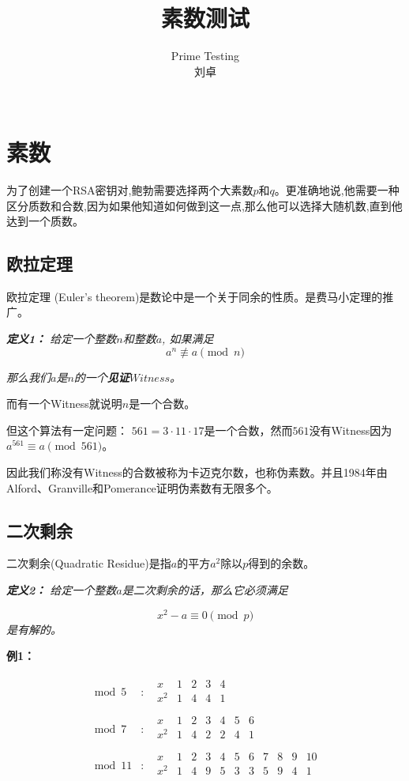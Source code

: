 \documentclass{article}
\date{}
\title{素数测试}
\author{
Prime Testing\\
 刘卓\\
 \texttt{ } \\
}
\begin{document}
\maketitle

\section{素数}


为了创建一个RSA密钥对,鲍勃需要选择两个大素数$p$和$q$。更准确地说,他需要一种区分质数和合数,因为如果他知道如何做到这一点,那么他可以选择大随机数,直到他达到一个质数。


\subsection{欧拉定理}

欧拉定理 (Euler's theorem)是数论中是一个关于同余的性质。是费马小定理的推广。

\textit{\textbf{定义1：} 给定一个整数$n$和整数$a$, 如果满足}
$$a^n \not\equiv a \pmod{n}$$

\textit{那么我们$a$是$n$的一个\textbf{见证$Witness$}。}

而有一个Witness就说明$n$是一个合数。

但这个算法有一定问题：
$561 = 3 \cdot 11 \cdot 17 $是一个合数，然而$561$没有Witness因为$a^{561} \equiv a \pmod{561}$。

因此我们称没有Witness的合数被称为卡迈克尔数，也称伪素数。并且1984年由Alford、Granville和Pomerance证明伪素数有无限多个。


\subsection{二次剩余}
二次剩余(Quadratic Residue)是指$a$的平方$a^2$除以$p$得到的余数。

\textit{\textbf{定义2：} 给定一个整数$a$是二次剩余的话，那么它必须满足}

$$x^2 - a \equiv 0 \pmod{p}$$
\textit{是有解的。}


\textbf{例1：}

\begin{eqnarray}   
\label{eq}
\bmod 5&:&  \begin{array}{c|cccc}
x & 1 & 2 & 3 & 4 \\
\hline x^{2} & 1 & 4 & 4 & 1\\
\end{array} \nonumber \\ 
\bmod 7&:&  \begin{array}{c|cccccc}
x & 1 & 2 & 3 & 4 & 5 & 6 \\
\hline x^{2} & 1 & 4 & 2 & 2 & 4 & 1\\
\end{array} \nonumber \\ 
\bmod 11&:&  \begin{array}{c|cccccccccc}
x & 1 & 2 & 3 & 4 & 5 & 6 & 7 & 8 & 9 & 10 \\
\hline x^{2} & 1 & 4 & 9 & 5 & 3 & 3 & 5 & 9 & 4 & 1\\
\end{array}\nonumber \\ 
\nonumber 
\end{eqnarray}
\end{document}
